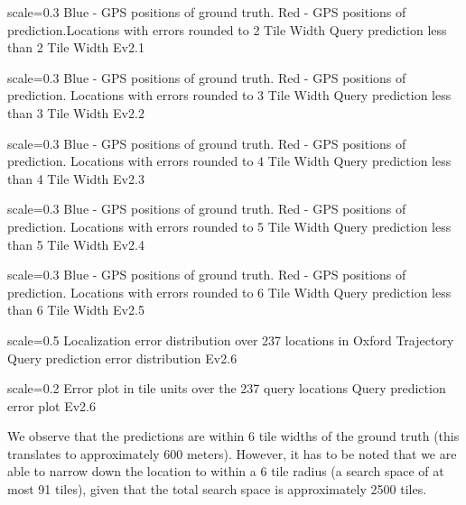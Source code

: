 {scale=0.3}%
{Blue - GPS positions of ground truth. Red - GPS positions of prediction.Locations with errors rounded to 2 Tile Width}%
{Query prediction less than 2 Tile Width}%
{Ev2.1}

{scale=0.3}%
{Blue - GPS positions of ground truth. Red - GPS positions of prediction. Locations with errors rounded to 3 Tile Width}%
{Query prediction less than 3 Tile Width}%
{Ev2.2}

{scale=0.3}%
{Blue - GPS positions of ground truth. Red - GPS positions of prediction. Locations with errors rounded to 4 Tile Width}%
{Query prediction less than 4 Tile Width}%
{Ev2.3}

{scale=0.3}%
{Blue - GPS positions of ground truth. Red - GPS positions of prediction. Locations with errors rounded to 5 Tile Width}%
{Query prediction less than 5 Tile Width}%
{Ev2.4}

{scale=0.3}%
{Blue - GPS positions of ground truth. Red - GPS positions of prediction. Locations with errors rounded to 6 Tile Width}%
{Query prediction less than 6 Tile Width}%
{Ev2.5}

{scale=0.5}%
{Localization error distribution over 237 locations in Oxford Trajectory}%
{Query prediction error distribution}%
{Ev2.6}

{scale=0.2}%
{Error plot in tile units over the 237 query locations}%
{Query prediction error plot}%
{Ev2.6}

\pagebreak
We observe that the predictions are within 6 tile widths of the ground truth (this translates to approximately 600 meters). However, it has to be noted that we are able to narrow down the location to within a 6 tile radius (a search space of at most 91 tiles), given that the total search space is approximately 2500 tiles. 

